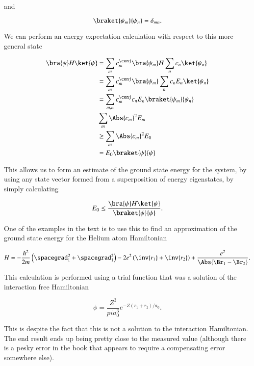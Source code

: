 and

\begin{equation}\label{eqn:variationHarmonicOscillator:50}
\braket{\psi_m}{\psi_n} = \delta_{mn}.
\end{equation}

We can perform an energy expectation calculation with respect to this more general state

\begin{align*}
\bra{\psi} H \ket{\psi} 
&= 
\sum_m c_{m}^\conj \bra{\psi_m} 
H
\sum_n c_{n} \ket{\psi_n} \\
&=
\sum_m c_{m}^\conj \bra{\psi_m}
\sum_n c_{n} E_n \ket{\psi_n} \\
&=
\sum_{m,n} c_{m}^\conj c_n E_n \braket{\psi_m}{\psi_n} \\
&
\sum_{m} \Abs{c_{m}}^2 E_m \\
&\ge
\sum_{m} \Abs{c_{m}}^2 E_0 \\
&=
E_0 \braket{\psi}{\psi}
\end{align*}

This allows us to form an estimate of the ground state energy for the system, by using any state vector formed from a superposition of energy eigenstates, by simply calculating

\begin{equation}\label{eqn:variationHarmonicOscillator:70}
E_0 \le \frac{\bra{\psi} H \ket{\psi}}{ \braket{\psi}{\psi} }.
\end{equation}

One of the examples in the text is to use this to find an approximation of the ground state energy for the Helium atom Hamiltonian

\begin{equation}\label{eqn:variationHarmonicOscillator:90}
H = 
-\frac{\hbar^2}{2m} \left( 
\spacegrad_1^2
+\spacegrad_1^2\right) - 2 e^2 \left( \inv{r_1} + \inv{r_2} \right) + \frac{e^2}{\Abs{\Br_1 - \Br_2}}.
\end{equation}

This calculation is performed using a trial function that was a solution of the interaction free Hamiltonian

\begin{equation}\label{eqn:variationHarmonicOscillator:110}
\phi = \frac{Z^3}{pi a_0^3} e^{-Z (r_1 + r_2)/a_0 }.
\end{equation}

This is despite the fact that this is not a solution to the interaction Hamiltonian.  The end result ends up being pretty close to the measured value (although there is a pesky error in the book that appears to require a compensating error somewhere else).

